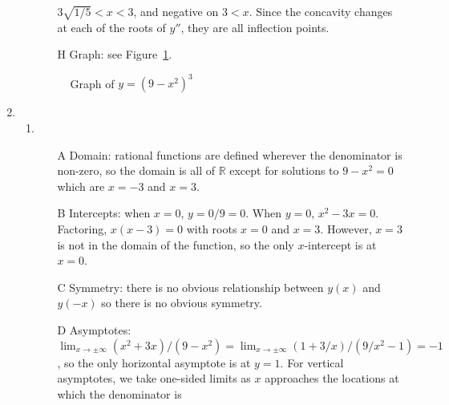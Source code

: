 \documentclass{article}
\begin{document}
\begin{enumerate}
\begin{enumerate}
\begin{itemize}
      $3\sqrt{1/5}<x<3$, and negative on $3<x$.  Since the concavity
      changes at each of the roots of $y''$, they are all inflection
      points.
    \item[H] Graph: see Figure~\ref{fig:9-x2all3}.
    \end{itemize}
    \begin{figure}[htbp]
      \centering
      \caption{Graph of $y=(9-x^2)^3$}
      \label{fig:9-x2all3}
    \end{figure}
  \end{enumerate}
\item %
  \begin{enumerate}
  \item %
    \begin{itemize}
    \item[A] Domain: rational functions are defined wherever the
      denominator is non-zero, so the domain is all of $\mathbb{R}$
      except for solutions to $9-x^2=0$ which are $x=-3$ and $x=3$.
    \item[B] Intercepts: when $x=0$, $y=0/9=0$.  When $y=0$,
      $x^2-3x=0$.  Factoring, $x(x-3)=0$ with roots $x=0$ and $x=3$.
      However, $x=3$ is not in the domain of the function, so the only
      $x$-intercept is at $x=0$.
    \item[C] Symmetry: there is no obvious relationship between $y(x)$
      and $y(-x)$ so there is no obvious symmetry.
    \item[D] Asymptotes:
      $\lim_{x\to\pm\infty} (x^2+3x)/(9-x^2) = \lim_{x\to\pm\infty}
      (1+3/x)/(9/x^2-1) = -1$, so the only horizontal asymptote is
      at $y=1$.  For vertical asymptotes, we take one-sided limits
      as $x$ approaches the locations at which the denominator is

\end{itemize}
\end{enumerate}
\end{enumerate}
\end{document}

